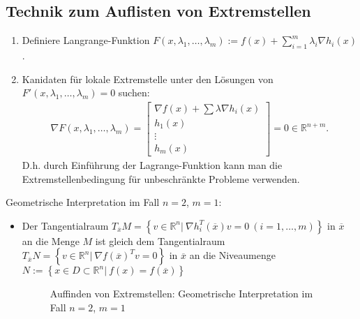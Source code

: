 \subsection{Technik zum Auflisten von Extremstellen}
\begin{enumerate}
  \item Definiere Langrange-Funktion $F(x,\lambda_1,\ldots,\lambda_m):=f(x)+\sum\limits_{i=1}^m\lambda_i\nabla h_i(x)$.
  \item Kanidaten für lokale Extremstelle unter den Lösungen von\\ $F'(x,\lambda_1,\ldots,\lambda_m)=0$ suchen:
	\begin{align*}
	\nabla F(x,\lambda_1,\ldots,\lambda_m)=\begin{bmatrix}
	\nabla f(x)+\sum\lambda\nabla h_i(x)\\
	h_1(x)\\
	\vdots\\
	h_m(x)
	\end{bmatrix} = 0\in\mathbb{R}^{n+m}.
	\end{align*}
	D.h. durch Einführung der Lagrange-Funktion kann man die Extremstellenbedingung für unbeschränkte Probleme verwenden. 
\end{enumerate}
Geometrische Interpretation im Fall $n=2$, $m=1$:
\begin{itemize}
  \item[] Der Tangentialraum $T_{\overline{x}}M=\left\{v\in\mathbb{R}^n|\ \nabla h_i^T(\overline{x})v=0\ (i=1,\ldots,m) \right\} $ in $\overline{x}$ an die Menge $M$ ist gleich dem
  Tangentialraum $T_{\overline{x}}N=\left\{ v\in\mathbb{R}^n|\ \nabla f(\overline{x})^Tv=0 \right\}$ in $\overline{x}$ an die Niveaumenge $N :=\left\{x\in D\subset\mathbb{R}^n|\
  f(x)=f(\overline{x})\right\}$
	\begin{figure}[htb]
	\centering
		
		\caption{Auffinden von Extremstellen: Geometrische Interpretation im Fall $n=2$, $m=1$}
		\label{fig:kap_1_tangraum}
	\end{figure}
\end{itemize}

